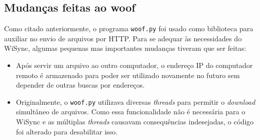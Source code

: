 \subsection{Mudanças feitas ao woof}
Como citado anteriormente, o programa \texttt{woof.py} \cite{woof} foi usado como biblioteca para auxiliar no envio de arquivos por HTTP.
Para se adequar às necessidades do WiSync, algumas pequenas mas importantes mudanças tiveram que ser feitas:
\begin{itemize}
  \item Após servir um arquivo ao outro computador, o endereço IP do computador remoto é armazenado para poder ser utilizado novamente no futuro sem depender de outras buscas por endereços.
  \item Originalmente, o \texttt{woof.py} utilizava diversas \textit{threads} para permitir o \textit{download} simultâneo de arquivos. Como essa funcionalidade não é necessária para o WiSync e as múltiplas \textit{threads} causavam consequências indesejadas, o código foi alterado para desabilitar isso. 
\end{itemize}

